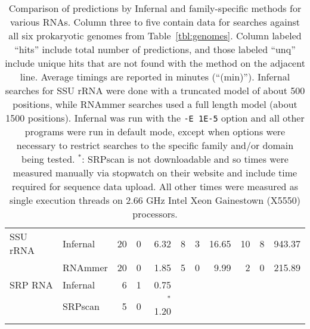 \begin{small}
\begin{table}
\begin{center}
\begin{tabular}{|l|l|rrr|rrr|rrr|}
SSU rRNA                   &  Infernal                   &   20 &   0 &    6.32 &    8 &   3 &   16.65 &   10 &   8 &  943.37  \\ 
                           &  RNAmmer                    &   20 &   0 &    1.85 &    5 &   0 &    9.99 &    2 &   0 &  215.89  \\ \hline 
SRP RNA                    &  Infernal                   &    6 &   1 &    0.75 & \multicolumn{6}{c}{} \\
                           &  SRPscan                    &    5 &   0 &$^*$1.20 & \multicolumn{6}{c}{} \\ \cline{1-5}
\multicolumn{8}{c}{} \\ 
\end{tabular}
\caption{Comparison of predictions by Infernal and family-specific
  methods for various RNAs. Column three to five contain data for searches
  against all six prokaryotic genomes from Table~\ref{tbl:genomes}.  Column
  labeled ``hits'' include total number of predictions, and those
  labeled ``unq'' include unique hits that are not found with the
  method on the adjacent line. Average timings are reported in minutes
  (``(min)'').  Infernal searches for SSU rRNA were done with a
  truncated model of about 500 positions, while RNAmmer searches used
  a full length model (about 1500 positions). Infernal was run with
  the {\tt -E 1E-5} option and all other programs were run in default
  mode, except when options were necessary to restrict searches to the
  specific family and/or domain being tested. $^*$: SRPscan is not
  downloadable and so times were measured manually via stopwatch on
  their website and include time required for sequence data
  upload. All other times were measured as single execution threads on
  2.66 GHz Intel Xeon Gainestown (X5550) processors.  }
\label{tbl:compare}
\end{center}

\end{table}
\end{small}
